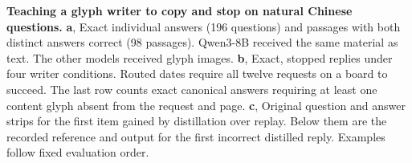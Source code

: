 \textbf{Teaching a glyph writer to copy and stop on natural Chinese questions.}
\textbf{a}, Exact individual answers (196 questions) and passages with both distinct answers correct (98 passages). Qwen3-8B received the same material as text. The other models received glyph images.
\textbf{b}, Exact, stopped replies under four writer conditions. Routed dates require all twelve requests on a board to succeed. The last row counts exact canonical answers requiring at least one content glyph absent from the request and page.
\textbf{c}, Original question and answer strips for the first item gained by distillation over replay. Below them are the recorded reference and output for the first incorrect distilled reply. Examples follow fixed evaluation order.
